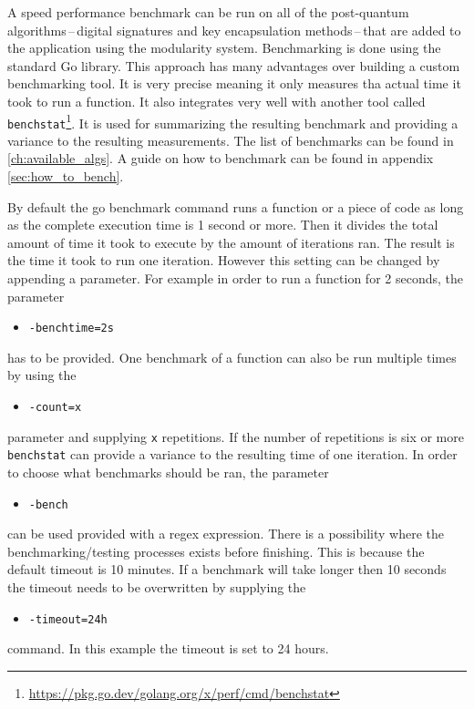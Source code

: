 A speed performance benchmark can be run on all of the post-quantum algorithms\,--\,digital signatures and key encapsulation methods\,--\,that are added to the application using the modularity system. Benchmarking is done using the standard Go library. This approach has many advantages over building a custom benchmarking tool. It is very precise meaning it only measures tha actual time it took to run a function.
It also integrates very well with another tool called \texttt{benchstat}\footnote{\url{https://pkg.go.dev/golang.org/x/perf/cmd/benchstat}}. It is used for summarizing the resulting benchmark and providing a variance to the resulting measurements. The list of benchmarks can be found in \ref{ch:available_algs}. A guide on how to benchmark can be found in appendix \ref{sec:how_to_bench}.

By default the go benchmark command runs a function or a piece of code as long as the complete execution time is 1 second or more. Then it divides the total amount of time it took to execute by the amount of iterations ran. The result is the time it took to run one iteration. However this setting can be changed by appending a parameter. For example in order to run a function for 2 seconds, the parameter
\begin{itemize}
  \item \texttt{-benchtime=2s}
\end{itemize}
has to be provided. One benchmark of a function can also be run multiple times by using the
\begin{itemize}
  \item \texttt{-count=x}
\end{itemize}
parameter and supplying \texttt{x} repetitions. If the number of repetitions is six or more \texttt{benchstat} can provide a variance to the resulting time of one iteration. In order to choose what benchmarks should be ran, the parameter
\begin{itemize}
  \item \texttt{-bench}
\end{itemize}
can be used provided with a regex expression. There is a possibility where the benchmarking/testing processes exists before finishing. This is because the default timeout is 10 minutes. If a benchmark will take longer then 10 seconds the timeout needs to be overwritten by supplying the
\begin{itemize}
  \item \texttt{-timeout=24h}
\end{itemize}
command. In this example the timeout is set to 24 hours.
